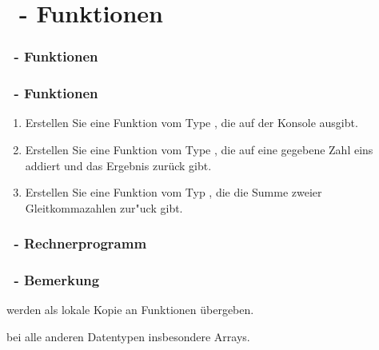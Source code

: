 \def\stitle{\theexercise\ - Funktionen}
\section{\stitle}
\begin{frame}
  \frametitle{\stitle}%
\tableofcontents[current]
\end{frame}

\begin{frame}[t]%
    \frametitle{\stitle}

\begin{enumerate}
\item Erstellen Sie eine Funktion vom Type , die  auf der Konsole ausgibt.
\item Erstellen Sie eine Funktion vom Type , die auf eine gegebene Zahl eins addiert und das Ergebnis zur\"uck gibt.
\item Erstellen Sie eine Funktion vom Typ , die die Summe zweier Gleitkommazahlen zur"uck gibt.
\end{enumerate}
\end{frame}

\begin{frame}[fragile]%
  \frametitle{\theexercise\ - Rechnerprogramm}%


\end{frame}


\begin{frame}[fragile]%
  \frametitle{\theexercise\ - Bemerkung}%

 werden als lokale Kopie an Funktionen übergeben.


 bei alle anderen Datentypen insbesondere Arrays.


\end{frame}
